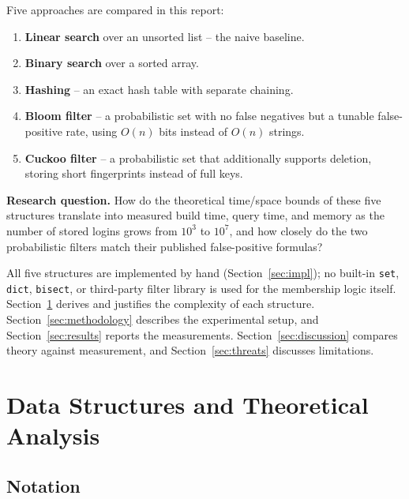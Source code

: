 \documentclass[acmsmall,screen,nonacm=true]{acmart}
\begin{document}
Five approaches are compared in this report:
\begin{enumerate}
  \item \textbf{Linear search} over an unsorted list -- the naive baseline.
  \item \textbf{Binary search} over a sorted array.
  \item \textbf{Hashing} -- an exact hash table with separate chaining.
  \item \textbf{Bloom filter} -- a probabilistic set with no false negatives
    but a tunable false-positive rate, using $O(n)$ bits instead of $O(n)$
    strings.
  \item \textbf{Cuckoo filter} -- a probabilistic set that additionally
    supports deletion, storing short fingerprints instead of full keys.
\end{enumerate}

\textbf{Research question.} How do the theoretical time/space bounds of
these five structures translate into measured build time, query time, and
memory as the number of stored logins grows from $10^3$ to $10^7$, and how
closely do the two probabilistic filters match their published
false-positive formulas?

All five structures are implemented by hand (Section~\ref{sec:impl}); no
built-in \texttt{set}, \texttt{dict}, \texttt{bisect}, or third-party filter
library is used for the membership logic itself. Section~\ref{sec:complexity}
derives and justifies the complexity of each structure.
Section~\ref{sec:methodology} describes the experimental setup, and
Section~\ref{sec:results} reports the measurements. Section~\ref{sec:discussion}
compares theory against measurement, and Section~\ref{sec:threats} discusses
limitations.

\section{Data Structures and Theoretical Analysis}
\label{sec:complexity}

\subsection{Notation}
\end{document}
